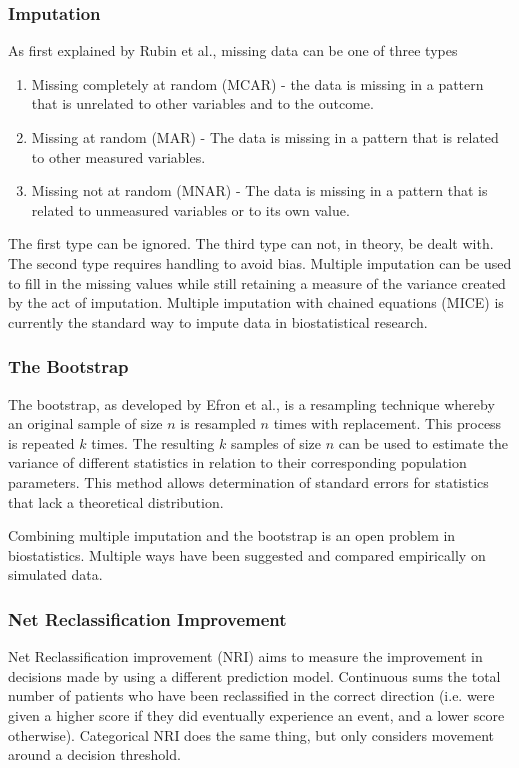 \documentclass[a4paper,12pt]{article}
\begin{document}
		\subsubsection{Imputation}
		As first explained by Rubin et al.\cite{Rubin1987}, missing data can be one of three types
		\begin{enumerate}
			\item Missing completely at random (MCAR) - the data is missing in a pattern that is unrelated to other variables and to the outcome.
			\item Missing at random (MAR) - The data is missing in a pattern that is related to other measured variables.
			\item Missing not at random (MNAR) - The data is missing in a pattern that is related to unmeasured variables or to its own value.
		\end{enumerate}
		The first type can be ignored. The third type can not, in theory, be dealt with. The second type requires handling to avoid bias. Multiple imputation can be used to fill in the missing values while still retaining a measure of the variance created by the act of imputation\cite{Rubin1987}. Multiple imputation with chained equations (MICE) is currently the standard way to impute data in biostatistical research\cite{Buuren2011}.
		
		\subsubsection{The Bootstrap}
		The bootstrap, as developed by Efron et al.\cite{BradleyEfron1994}, is a resampling technique whereby an original sample of size $ n $ is resampled $ n $ times with replacement. This process is repeated $ k $ times. The resulting $ k  $ samples of size $ n  $ can be used to estimate the variance of different statistics in relation to their corresponding population parameters. This method allows determination of standard errors for statistics that lack a theoretical distribution.
		
		Combining multiple imputation and the bootstrap is an open problem in biostatistics. Multiple ways have been suggested and compared empirically on simulated data\cite{Schomaker2016}.
		
		\subsubsection{Net Reclassification Improvement}
		Net Reclassification improvement (NRI) aims to measure the improvement in decisions made by using a different prediction model\cite{Pencina2008}. Continuous sums the total number of patients who have been reclassified in the correct direction (i.e. were given a higher score if they did eventually experience an event, and a lower score otherwise). Categorical NRI does the same thing, but only considers movement around a decision threshold.
		
\end{document}
